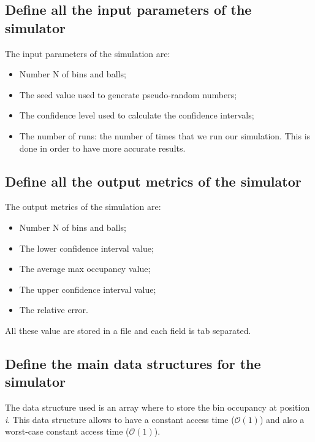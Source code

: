 \documentclass{report}
\begin{document}
		\subsection{Define all the input parameters of the simulator}
			The input parameters of the simulation are:
			\begin{itemize}
				\item Number N of bins and balls;
				\item The seed value used to generate pseudo-random numbers;
				\item The confidence level used to calculate the confidence intervals;
				\item The number of runs: the number of times that we run our simulation. This is done in order to have more accurate results.
			\end{itemize}
			 
	\subsection{Define all the output metrics of the simulator}
			The output metrics of the simulation are:
			\begin{itemize}
				\item Number N of bins and balls;
				\item The lower confidence interval value;
				\item The average max occupancy value;
				\item The upper confidence interval value;
				\item The relative error.
			\end{itemize}
			All these value are stored in a file and each field is tab separated.
	
	\subsection{Define the main data structures for the simulator}
			The data structure used is an array where to store the bin occupancy at position \emph{i}. This data structure allows to have a constant access time ($\mathcal{O}(1)$) and also a worst-case constant access time ($\mathcal{O}(1)$).
			
\end{document}
